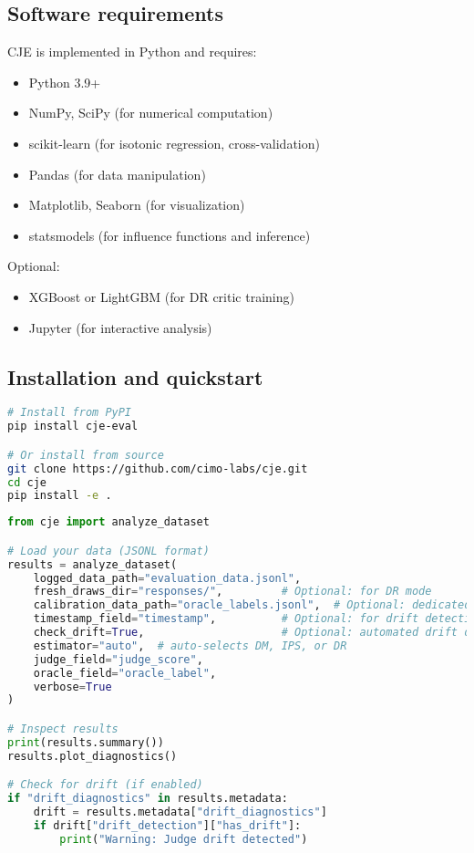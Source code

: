 \subsection{Software requirements}

CJE is implemented in Python and requires:
\begin{itemize}
\item Python 3.9+
\item NumPy, SciPy (for numerical computation)
\item scikit-learn (for isotonic regression, cross-validation)
\item Pandas (for data manipulation)
\item Matplotlib, Seaborn (for visualization)
\item statsmodels (for influence functions and inference)
\end{itemize}

Optional:
\begin{itemize}
\item XGBoost or LightGBM (for DR critic training)
\item Jupyter (for interactive analysis)
\end{itemize}

\subsection{Installation and quickstart}

\begin{lstlisting}[language=bash,caption=Installation]
# Install from PyPI
pip install cje-eval

# Or install from source
git clone https://github.com/cimo-labs/cje.git
cd cje
pip install -e .
\end{lstlisting}

\begin{lstlisting}[language=Python,caption=Quickstart Example]
from cje import analyze_dataset

# Load your data (JSONL format)
results = analyze_dataset(
    logged_data_path="evaluation_data.jsonl",
    fresh_draws_dir="responses/",         # Optional: for DR mode
    calibration_data_path="oracle_labels.jsonl",  # Optional: dedicated calibration set
    timestamp_field="timestamp",          # Optional: for drift detection
    check_drift=True,                     # Optional: automated drift detection
    estimator="auto",  # auto-selects DM, IPS, or DR
    judge_field="judge_score",
    oracle_field="oracle_label",
    verbose=True
)

# Inspect results
print(results.summary())
results.plot_diagnostics()

# Check for drift (if enabled)
if "drift_diagnostics" in results.metadata:
    drift = results.metadata["drift_diagnostics"]
    if drift["drift_detection"]["has_drift"]:
        print("Warning: Judge drift detected")
\end{lstlisting}

